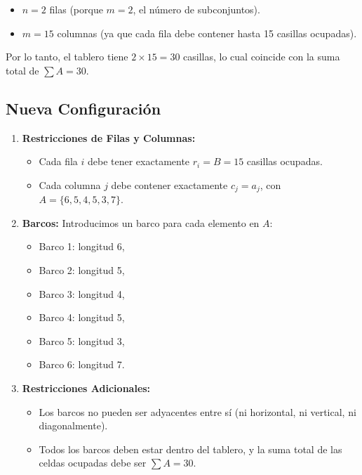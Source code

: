 \begin{itemize}
    \item $n = 2$ filas (porque $m = 2$, el número de subconjuntos). %
    \item $m = 15$ columnas (ya que cada fila debe contener hasta 15 casillas ocupadas). %
\end{itemize}

Por lo tanto, el tablero tiene $2 \times 15 = 30$ casillas, lo cual coincide con la suma total de $\sum A = 30$. %

\subsection*{Nueva Configuración}

\begin{enumerate}
    \item \textbf{Restricciones de Filas y Columnas:}
    \begin{itemize}
        \item Cada fila $i$ debe tener exactamente $r_i = B = 15$ casillas ocupadas.
        \item Cada columna $j$ debe contener exactamente $c_j = a_j$, con $A = \{6, 5, 4, 5, 3, 7\}$.
    \end{itemize}

    \item \textbf{Barcos:}
    Introducimos un barco para cada elemento en $A$:
    \begin{itemize}
        \item Barco 1: longitud 6,
        \item Barco 2: longitud 5,
        \item Barco 3: longitud 4,
        \item Barco 4: longitud 5,
        \item Barco 5: longitud 3,
        \item Barco 6: longitud 7.
    \end{itemize}

    \item \textbf{Restricciones Adicionales:}
    \begin{itemize}
        \item Los barcos no pueden ser adyacentes entre sí (ni horizontal, ni vertical, ni diagonalmente).
        \item Todos los barcos deben estar dentro del tablero, y la suma total de las celdas ocupadas debe ser $\sum A = 30$.
    \end{itemize}
\end{enumerate}

